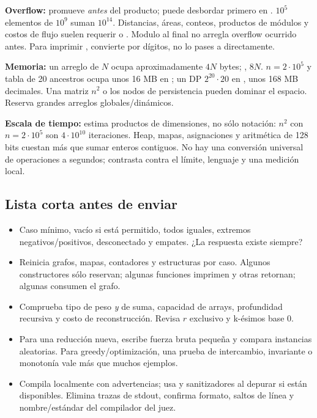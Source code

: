 \textbf{Overflow:}  promueve \emph{antes} del producto;  puede desbordar primero en . $10^5$ elementos de $10^9$ suman $10^{14}$. Distancias, áreas, conteos, productos de módulos y costos de flujo suelen requerir  o . Modulo al final no arregla overflow ocurrido antes. Para imprimir , convierte por dígitos, no lo pases a  directamente.

\textbf{Memoria:} un arreglo de $N$  ocupa aproximadamente $4N$ bytes; , $8N$. $n=2\cdot10^5$ y tabla de 20 ancestros ocupa unos 16 MB en ; un DP $2^{20}\cdot20$ en , unos 168 MB decimales. Una matriz $n^2$ o los nodos de persistencia pueden dominar el espacio. Reserva grandes arreglos globales/dinámicos.

\textbf{Escala de tiempo:} estima productos de dimensiones, no sólo notación: $n^2$ con $n=2\cdot10^5$ son $4\cdot10^{10}$ iteraciones. Heap, mapas, asignaciones y aritmética de 128 bits cuestan más que sumar enteros contiguos. No hay una conversión universal de operaciones a segundos; contrasta contra el límite, lenguaje y una medición local.

\subsection{Lista corta antes de enviar}
\begin{itemize}
\item Caso mínimo, vacío si está permitido, todos iguales, extremos negativos/positivos, desconectado y empates. ¿La respuesta existe siempre?
\item Reinicia grafos, mapas, contadores y estructuras por caso. Algunos constructores sólo reservan; algunas funciones imprimen y otras retornan; algunas consumen el grafo.
\item Comprueba tipo de peso \emph{y} de suma, capacidad de arrays, profundidad recursiva y costo de reconstrucción. Revisa $r$ exclusivo y k-ésimos base 0.
\item Para una reducción nueva, escribe fuerza bruta pequeña y compara instancias aleatorias. Para greedy/optimización, una prueba de intercambio, invariante o monotonía vale más que muchos ejemplos.
\item Compila localmente con advertencias; usa  y sanitizadores al depurar si están disponibles. Elimina trazas de stdout, confirma formato, saltos de línea y nombre/estándar del compilador del juez.
\end{itemize}
